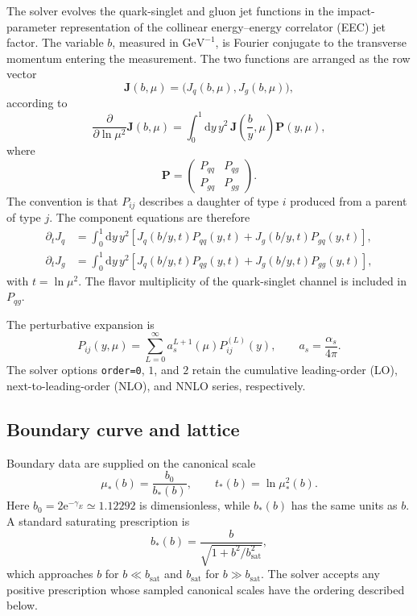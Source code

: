 \documentclass[11pt]{article}
\newcommand{\dd}{\mathrm{d}}
\newcommand{\as}{a_s}
\newcommand{\ee}{\mathrm{e}}
\newcommand{\Jvec}{\bm J}
\newcommand{\Pmat}{\bm P}
\begin{document}
The solver evolves the quark-singlet and gluon jet functions in the
impact-parameter representation of the collinear energy--energy correlator
(EEC) jet factor. The variable \(b\), measured in \(\mathrm{GeV}^{-1}\), is
Fourier conjugate to the transverse momentum entering the measurement. The
two functions are arranged as the row vector
\[
  \Jvec(b,\mu)=\bigl(J_q(b,\mu),J_g(b,\mu)\bigr),
\]
according to
\begin{equation}
  \frac{\partial}{\partial\ln\mu^2}\Jvec(b,\mu)
  =
  \int_0^1 \dd y\,y^2\,
  \Jvec\left(\frac{b}{y},\mu\right)\Pmat(y,\mu),
  \label{eq:continuum-rg}
\end{equation}
where
\[
  \Pmat=
  \begin{pmatrix}
    P_{qq} & P_{qg}\\
    P_{gq} & P_{gg}
  \end{pmatrix}.
\]
The convention is that \(P_{ij}\) describes a daughter of type \(i\)
produced from a parent of type \(j\). The component equations are therefore
\begin{align}
  \partial_tJ_q
  &=
  \int_0^1\dd y\,y^2
  \left[
    J_q(b/y,t)P_{qq}(y,t)
    +J_g(b/y,t)P_{gq}(y,t)
  \right],
  \label{eq:component-q}\\
  \partial_tJ_g
  &=
  \int_0^1\dd y\,y^2
  \left[
    J_q(b/y,t)P_{qg}(y,t)
    +J_g(b/y,t)P_{gg}(y,t)
  \right],
  \label{eq:component-g}
\end{align}
with \(t=\ln\mu^2\). The flavor multiplicity of the quark-singlet channel is
included in \(P_{qg}\).

The perturbative expansion is
\begin{equation}
  P_{ij}(y,\mu)
  =
  \sum_{L=0}^{\infty}
  \as^{L+1}(\mu)P_{ij}^{(L)}(y),
  \qquad
  \as=\frac{\alpha_s}{4\pi}.
  \label{eq:pert-series}
\end{equation}
The solver options \texttt{order=0}, \(1\), and \(2\) retain the cumulative
leading-order (LO), next-to-leading-order (NLO), and NNLO series,
respectively.

\subsection{Boundary curve and lattice}

Boundary data are supplied on the canonical scale
\begin{equation}
  \mu_*(b)=\frac{b_0}{b_*(b)},
  \qquad
  t_*(b)=\ln\mu_*^2(b).
  \label{eq:boundary-curve}
\end{equation}
Here \(b_0=2\ee^{-\gamma_E}\simeq1.12292\) is dimensionless, while \(b_*(b)\)
has the same units as \(b\). A standard saturating prescription is
\[
  b_*(b)=\frac{b}{\sqrt{1+b^2/b_{\mathrm{sat}}^2}},
\]
which approaches \(b\) for \(b\ll b_{\mathrm{sat}}\) and
\(b_{\mathrm{sat}}\) for \(b\gg b_{\mathrm{sat}}\). The solver accepts any
positive prescription whose sampled canonical scales have the ordering
described below.
\end{document}
